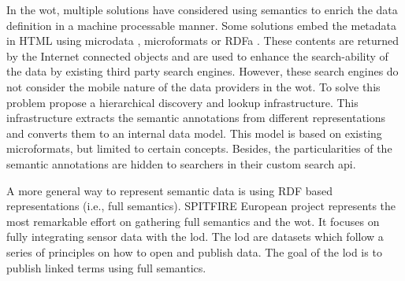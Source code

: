 In the \acl{wot}, multiple solutions have considered using semantics to enrich the data definition in a machine processable manner.
Some solutions embed the metadata in HTML using microdata , microformats  or RDFa .
These contents are returned by the Internet connected objects and are used to enhance the search-ability of the data by existing third party search engines.
However, these search engines do not consider the mobile nature of the data providers in the \ac{wot}. %
To solve this problem \citet{trifa_leveraging_2011} propose a hierarchical discovery and lookup infrastructure.
This infrastructure extracts the semantic annotations from different representations and converts them to an internal data model.
This model is based on existing microformats, but limited to certain concepts.
Besides, the particularities of the semantic annotations are hidden to searchers in their custom search \acs{api}. %


A more general way to represent semantic data is using RDF  based representations (i.e., full semantics). %
SPITFIRE European project  represents the most remarkable effort on gathering full semantics and the \ac{wot}.
It focuses on fully integrating sensor data with the \ac{lod}. 
The \ac{lod} are datasets which follow a series of principles on how to open and publish data.
The goal of the \ac{lod} is to publish linked terms using full semantics.

